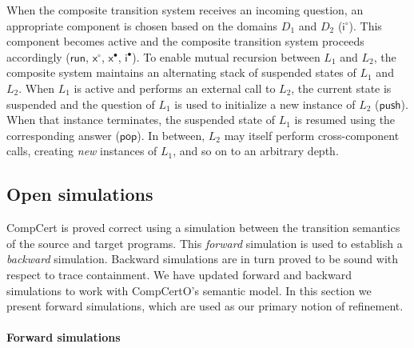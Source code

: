 \documentclass[sigplan,screen,review]{acmart}
\newcommand{\kw}[1]{\ensuremath{ \mathsf{#1} }}
\newcommand{\que}{\circ}
\newcommand{\ans}{\bullet}
\begin{document}

When the composite transition system
receives an incoming question,
an appropriate component is chosen
based on the domains $D_1$ and $D_2$
($\kw{i}^\que$).
This component becomes active
and the composite transition system
proceeds accordingly
($\kw{run}$, $\kw{x}^\que$, $\kw{x}^\ans$, $\kw{i}^\ans$).
%
To enable mutual recursion between $L_1$ and $L_2$,
the composite system
maintains an alternating stack of suspended states
of $L_1$ and $L_2$.
When $L_1$ is active
and performs an external call to $L_2$,
the current state is suspended
and the question of $L_1$
is used to initialize a new instance of $L_2$
($\kw{push}$).
When that instance terminates,
the suspended state of $L_1$ is resumed
using the corresponding answer ($\kw{pop}$).
In between,
$L_2$ may itself perform cross-component calls,
creating \emph{new} instances of $L_1$,
and so on to an arbitrary depth.



\subsection{Open simulations} \label{sec:sem:ref} %

CompCert is proved correct using a simulation
between the transition semantics of the source and target programs.
This \emph{forward}
simulation is used to establish a \emph{backward} simulation.
Backward simulations
are in turn proved to be sound with respect to trace containment.
We have updated forward and backward simulations to
work with CompCertO's semantic model.
In this section we present forward simulations,
which are
used as our primary notion of refinement.

\paragraph{Forward simulations} %
\end{document}
